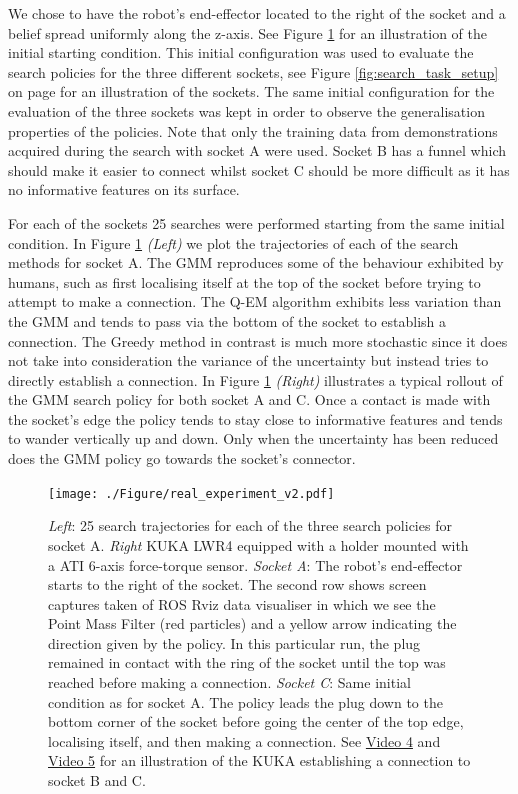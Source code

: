 \documentclass[final,5p,times,twocolumn]{elsarticle}
\begin{document}
We chose to have the robot's end-effector located to the right of the socket and a belief spread uniformly 
along the z-axis. See Figure \ref{fig:real_pictures} for an illustration of the initial starting condition.
This initial configuration was used to evaluate the search policies for the three different sockets, see Figure \ref{fig:search_task_setup} 
on page \pageref{fig:search_task_setup} for an illustration of the sockets. The same initial configuration for 
the evaluation of the three sockets was kept in order to observe the generalisation properties of the policies. 
Note that only the training data from demonstrations acquired during the search with socket A were used. 
Socket B has a funnel which should make it easier to connect whilst socket C should be more difficult as it has no informative features on its surface. 

For each of the sockets 25 searches were performed starting from the same initial condition. 
In Figure \ref{fig:real_pictures} \textit{(Left)} we plot the trajectories of each of the search methods for socket A. The GMM reproduces some of the behaviour exhibited by humans, such as 
first localising itself at the top of the socket before trying to attempt to make a connection. The Q-EM algorithm exhibits less variation
than the GMM and tends to pass via the bottom of the socket to establish a connection. The Greedy method in contrast is much more  
stochastic since it does not take into consideration the variance of the uncertainty but instead tries to directly establish a connection.
In Figure \ref{fig:real_pictures} \textit{(Right)} illustrates a typical rollout of the GMM search policy for both 
socket A and C. Once a contact is made with the socket's edge the policy tends to stay close to informative features and tends to 
wander vertically up and down. Only when the uncertainty has been reduced does the GMM policy go towards the socket's connector. 

\begin{figure}
 \centering
 \texttt{[image: ./Figure/real\_experiment\_v2.pdf]}
 \caption{\textit{Left}: 25 search trajectories for each of the three search policies for socket A. 
 \textit{Right} KUKA LWR4 equipped with a holder mounted with a ATI 6-axis force-torque sensor. \textit{Socket A}: The robot's end-effector starts to the 
 right of the socket. The second row shows screen captures taken of ROS Rviz data visualiser in which we see the Point Mass Filter 
 (red particles) and a yellow arrow indicating the direction given by the policy. In this particular run, the plug remained in contact with the ring of the socket until 
 the top was reached before making a connection. \textit{Socket C}: Same initial condition as for socket A. The policy leads the plug down to 
 the bottom corner of the socket before going the center of the top edge, localising itself, and then making a connection. See \href{http://lasa.epfl.ch/videos/gpldecha/pih-search/KUKA_socket_B_connection.wmv}{Video 4}
 and \href{http://lasa.epfl.ch/videos/gpldecha/pih-search/KUKA_socket_C_connection.wmv}{Video 5} for an illustration of the KUKA establishing a connection to socket B and C.
 }
 \label{fig:real_pictures}
\end{figure}
\end{document}
